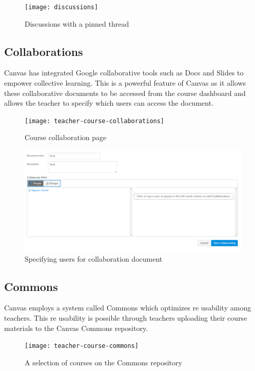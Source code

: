 \begin{figure}
\centering
\texttt{[image: discussions]}
\caption{Discussions with a pinned thread}
\end{figure}

\subsection{Collaborations}
Canvas has integrated Google collaborative tools such as Docs and Slides to empower collective learning. This is a powerful feature of Canvas as it allows these collaborative documents to be accessed from the course dashboard and allows the teacher to specify which users can access the document.


\begin{figure}[!htbp]
\centering
\texttt{[image: teacher-course-collaborations]}
\caption{Course collaboration page}
\end{figure}


\begin{figure}
    \centering
    \includegraphics[scale=0.3]{Thesis/ThesisA/images/teacher-course-collaborations-2.png}
    \caption{Specifying users for collaboration document}
\end{figure}

\subsection{Commons}
Canvas employs a system called Commons which optimizes re usability among teachers. This re usability is possible through teachers uploading their course materials to the Canvas Commons repository. 

\begin{figure}
\centering
\texttt{[image: teacher-course-commons]}
\caption{A selection of courses on the Commons repository}
\end{figure}

